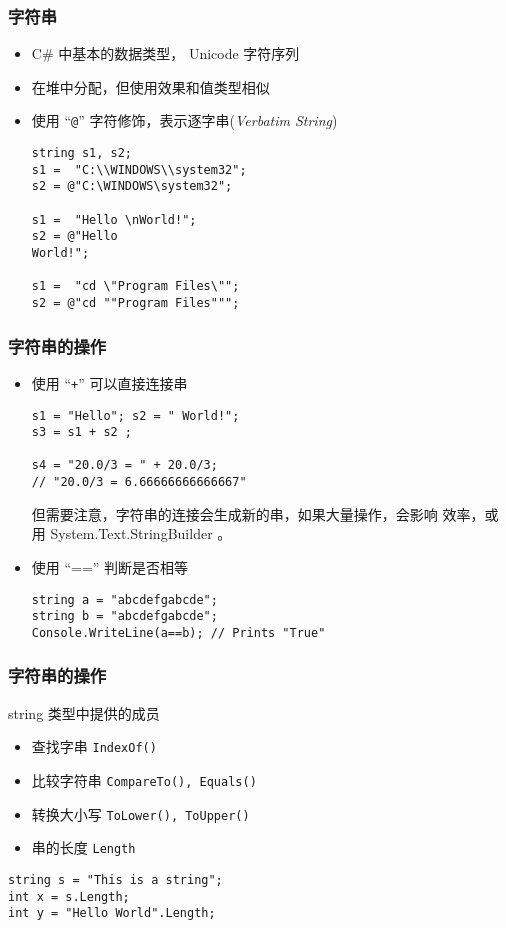 \begin{frame}[fragile]
\frametitle{字符串}
\begin{itemize}
\item C\# 中基本的数据类型， Unicode 字符序列
\item 在堆中分配，但使用效果和值类型相似\pause
\item 使用 ``\texttt{@}'' 字符修饰，表示{\redwarn 逐字串}(\textit{Verbatim String})
\begin{lstlisting}
string s1, s2;
s1 =  "C:\\WINDOWS\\system32";
s2 = @"C:\WINDOWS\system32";

s1 =  "Hello \nWorld!";
s2 = @"Hello
World!";

s1 =  "cd \"Program Files\"";
s2 = @"cd ""Program Files""";
\end{lstlisting}
\end{itemize}
\end{frame}

\begin{frame}[fragile]
\frametitle{字符串的操作}
\begin{itemize}
\item 使用 ``\texttt{+}'' 可以直接连接串
\begin{lstlisting}
s1 = "Hello"; s2 = " World!";
s3 = s1 + s2 ;

s4 = "20.0/3 = " + 20.0/3;
// "20.0/3 = 6.66666666666667"
\end{lstlisting}

  \CJKindent \small 但需要注意，字符串的连接会生成新的串，如果大量操作，会影响
  效率，或用 System.Text.StringBuilder 。
\pause
\item 使用 ``=='' 判断是否相等
\begin{lstlisting}
string a = "abcdefgabcde";
string b = "abcdefgabcde";
Console.WriteLine(a==b); // Prints "True"
\end{lstlisting}
\end{itemize}
\end{frame}

\begin{frame}[fragile]
\frametitle{字符串的操作}
string 类型中提供的成员
\medskip
  \begin{itemize}
\setlength{\itemsep}{6pt plus 1pt}
  \item 查找字串 \texttt{IndexOf()}
  \item 比较字符串 \texttt{CompareTo(), Equals()}
  \item 转换大小写 \texttt{ToLower(), ToUpper()}
  \item 串的长度 \texttt{Length}
  \end{itemize}
\begin{lstlisting}
string s = "This is a string";
int x = s.Length;
int y = "Hello World".Length;
\end{lstlisting}
\end{frame}

